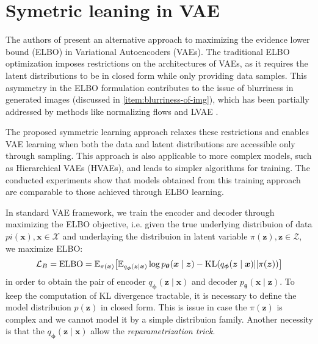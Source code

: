 \section{Symetric leaning in VAE}
The authors of \cite{sym-learning-2023} present an alternative approach to maximizing the evidence lower bound (ELBO)
in Variational Autoencoders (VAEs). The traditional ELBO optimization imposes restrictions on the architectures of 
VAEs, as it requires the latent distributions to be in closed form while only providing data samples. This asymmetry in
the ELBO formulation contributes to the issue of blurriness in generated images (discussed in \ref{item:blurriness-of-img}),
which has been partially addressed by methods like normalizing flows \cite{nf-2015} and LVAE \cite{lvae-2016}.

The proposed symmetric learning approach relaxes these restrictions and enables VAE learning when both the data and 
latent distributions are accessible only through sampling. This approach is also applicable to more complex models, such 
as Hierarchical VAEs (HVAEs), and leads to simpler algorithms for training. The conducted experiments show that models obtained 
from this training approach are comparable to those achieved through ELBO learning.

In standard VAE framework, we train the encoder  and decoder through maximizing the ELBO objective, i.e.
given the true underlying distribuion of data $pi(\boldsymbol{x}), \boldsymbol{x} \in \mathcal{X}$ and underlaying
the distribuion in latent variable $\pi(\boldsymbol{z}), \boldsymbol{z} \in \mathcal{Z}$, we maximize ELBO:
$$
\mathcal{L}_{B} = \mathrm{ELBO} = \operatorname{\mathbb{E}}_{\pi(\boldsymbol{x})} \bigl[ \operatorname{\mathbb{E}}_{q_{\boldsymbol{\phi}}(\boldsymbol{z} \mid \boldsymbol{x})} 
\log p_{\boldsymbol{\theta}}(\boldsymbol{x} \mid \boldsymbol{z}) - \mathrm{KL} (q_{\boldsymbol{\phi}}(\boldsymbol{z} \mid \boldsymbol{x}) || 
\pi(\boldsymbol{z})) \bigr]
$$
in order to obtain the pair of encoder $q_{\boldsymbol{\phi}}(\boldsymbol{z} \mid \boldsymbol{x})$ and decoder
$p_{\boldsymbol{\theta}}(\boldsymbol{x} \mid \boldsymbol{z})$. To keep the computation of KL divergence tractable, it is necessary to define
the model distribuion $p(\boldsymbol{z})$ in closed form. This is issue in case the $\pi(\boldsymbol{z})$ is complex and we cannot model 
it by a simple distribuion family. Another necessity is that the $q_{\boldsymbol{\phi}}(\boldsymbol{z} \mid \boldsymbol{x})$ allow the 
\textit{reparametrization trick}. 

